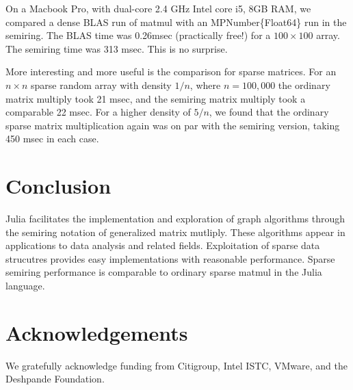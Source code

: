 \documentclass[conference]{IEEEtran}
\begin{document}
On a Macbook Pro, with dual-core 2.4 GHz Intel core i5, 8GB RAM, we compared a dense BLAS run of matmul with an MPNumber\{Float64\} run in the semiring.
The BLAS time was 0.26msec (practically free!) for a $100 \times 100$ array.  The semiring time
was 313 msec.  This is no surprise.

More interesting and more useful is the comparison for sparse
matrices.  For an $n \times n$ sparse random array with density $1/n$,
where $n = 100,000$ the ordinary matrix multiply took 21 msec, and the
semiring matrix multiply took a comparable 22 msec. For a higher
density of $5/n$, we found that the ordinary sparse matrix
multiplication again was on par with the semiring version, taking 450
msec in each case.


\section{Conclusion}

Julia facilitates the implementation and exploration of graph
algorithms through the semiring notation of generalized matrix
mutliply.  These algorithms appear in applications to data analysis
and related fields.  Exploitation of sparse data strucutres provides
easy implementations with reasonable performance.  Sparse semiring
performance is comparable to ordinary sparse matmul in the Julia
language.

\section{Acknowledgements}

We gratefully acknowledge funding from Citigroup, Intel ISTC, VMware, and the Deshpande Foundation.



\end{document}
